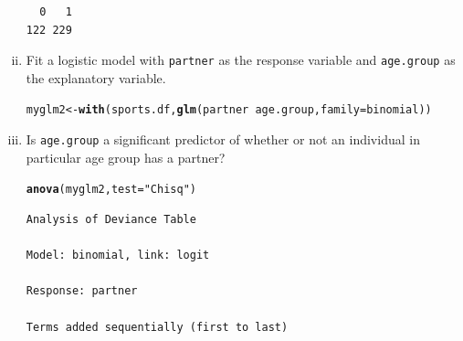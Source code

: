 \documentclass[12pt,a4paper]{article}\usepackage[]{graphicx}\usepackage[]{color}
\makeatletter
\newcommand{\hlstr}[1]{\textcolor[rgb]{0.192,0.494,0.8}{#1}}%
\newcommand{\hlopt}[1]{\textcolor[rgb]{0,0,0}{#1}}%
\newcommand{\hlstd}[1]{\textcolor[rgb]{0.345,0.345,0.345}{#1}}%
\newcommand{\hlkwb}[1]{\textcolor[rgb]{0.69,0.353,0.396}{#1}}%
\newcommand{\hlkwc}[1]{\textcolor[rgb]{0.333,0.667,0.333}{#1}}%
\newcommand{\hlkwd}[1]{\textcolor[rgb]{0.737,0.353,0.396}{\textbf{#1}}}%
\newenvironment{kframe}{%
 \def\at@end@of@kframe{}%
 \ifinner\ifhmode%
  \def\at@end@of@kframe{\end{minipage}}%
  \begin{minipage}{\columnwidth}%
 \fi\fi%
 \def\FrameCommand##1{\hskip\@totalleftmargin \hskip-\fboxsep
 \colorbox{shadecolor}{##1}\hskip-\fboxsep
     \hskip-\linewidth \hskip-\@totalleftmargin \hskip\columnwidth}%
 \MakeFramed {\advance\hsize-\width
   \@totalleftmargin\z@ \linewidth\hsize
   \@setminipage}}%
 {\par\unskip\endMakeFramed%
 \at@end@of@kframe}
\newenvironment{knitrout}{}{} %
\makeatother
\begin{document}
\begin{enumerate}[(i)]
\begin{knitrout}
\begin{kframe}
\begin{verbatim}
  0   1 
122 229 
\end{verbatim}
\end{kframe}
\end{knitrout}
\item Fit a logistic model with \texttt{partner} as the response variable and \texttt{age.group} as the explanatory variable.
\begin{knitrout}
\color{fgcolor}\begin{kframe}
\begin{alltt}
\hlstd{myglm2} \hlkwb{<-} \hlkwd{with}\hlstd{(sports.df,} \hlkwd{glm}\hlstd{(partner}\hlopt{~}\hlstd{age.group,} \hlkwc{family} \hlstd{= binomial))}
\end{alltt}
\end{kframe}
\end{knitrout}
\item Is \texttt{age.group} a significant predictor of whether or not an individual in particular age group has a partner?
\begin{knitrout}
\color{fgcolor}\begin{kframe}
\begin{alltt}
\hlkwd{anova}\hlstd{(myglm2,} \hlkwc{test} \hlstd{=} \hlstr{"Chisq"}\hlstd{)}
\end{alltt}
\begin{verbatim}
Analysis of Deviance Table

Model: binomial, link: logit

Response: partner

Terms added sequentially (first to last)



\end{verbatim}
\end{kframe}
\end{knitrout}
\end{enumerate}
\end{document}
